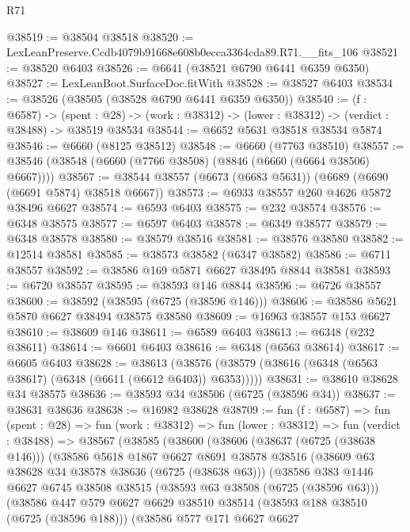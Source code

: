 \begin{lexlean}{R71}
\begin{coremodule}
@38519 := @38504 @38518
@38520 := LexLeanPreserve.Ccdb4079b91668e608b0ecca3364cda89.R71.__fits_106
@38521 := @38520 @6403
@38526 := @6641 (@38521 @6790 @6441 @6359 @6350)
@38527 := LexLeanBoot.SurfaceDoc.fitWith
@38528 := @38527 @6403
@38534 := @38526 (@38505 (@38528 @6790 @6441 @6359 @6350))
@38540 := (f : @6587) ->
  (spent : @28) -> (work : @38312) -> (lower : @38312) -> (verdict : @38488) -> @38519 @38534
@38544 := @6652 @5631 @38518 @38534 @5874
@38546 := @6660 (@8125 @38512)
@38548 := @6660 (@7763 @38510)
@38557 := @38546 (@38548 (@6660 (@7766 @38508) (@8846 (@6660 (@6664 @38506) @6667))))
@38567 := @38544 @38557 (@6673 (@6683 @5631)) (@6689 (@6690 (@6691 @5874) @38518 @6667))
@38573 := @6933 @38557 @260 @4626 @5872 @38496 @6627
@38574 := @6593 @6403
@38575 := @232 @38574
@38576 := @6348 @38575
@38577 := @6597 @6403
@38578 := @6349 @38577
@38579 := @6348 @38578
@38580 := @38579 @38516
@38581 := @38576 @38580
@38582 := @12514 @38581
@38585 := @38573 @38582 (@6347 @38582)
@38586 := @6711 @38557
@38592 := @38586 @169 @5871 @6627 @38495 @8844 @38581
@38593 := @6720 @38557
@38595 := @38593 @146 @8844
@38596 := @6726 @38557
@38600 := @38592 (@38595 (@6725 (@38596 @146)))
@38606 := @38586 @5621 @5870 @6627 @38494 @38575 @38580
@38609 := @16963 @38557 @153 @6627
@38610 := @38609 @146
@38611 := @6589 @6403
@38613 := @6348 (@232 @38611)
@38614 := @6601 @6403
@38616 := @6348 (@6563 @38614)
@38617 := @6605 @6403
@38628 := @38613
    (@38576 (@38579 (@38616 (@6348 (@6563 @38617) (@6348 (@6611 (@6612 @6403)) @6353)))))
@38631 := @38610 @38628 @34 @38575
@38636 := @38593 @34 @38506 (@6725 (@38596 @34))
@38637 := @38631 @38636
@38638 := @16982 @38628
@38709 := fun (f : @6587) =>
  fun (spent : @28) =>
  fun (work : @38312) =>
  fun (lower : @38312) =>
  fun (verdict : @38488) =>
  @38567
    (@38585
      (@38600
        (@38606
          (@38637 (@6725 (@38638 @146)))
          (@38586
            @5618
            @1867
            @6627
            @8691
            @38578
            @38516
            (@38609 @63 @38628 @34 @38578 @38636 (@6725 (@38638 @63)))
            (@38586
              @383
              @1446
              @6627
              @6745
              @38508
              @38515
              (@38593 @63 @38508 (@6725 (@38596 @63)))
              (@38586
                @447
                @579
                @6627
                @6629
                @38510
                @38514
                (@38593 @188 @38510 (@6725 (@38596 @188)))
                (@38586
                  @577
                  @171
                  @6627
                  @6627

\end{coremodule}
\end{lexlean}
